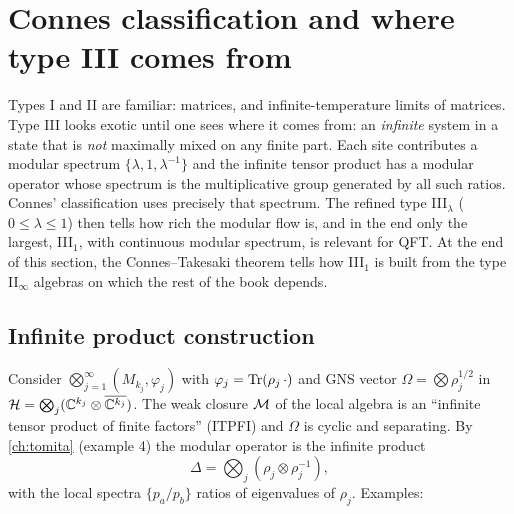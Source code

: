 \section{Connes classification and where type III comes from}\label{ch:connes_class}

\mshift{51mm}\begin{physmotiv}
Types I and II are familiar: matrices, and infinite-temperature limits of matrices. Type III looks exotic until one sees where it comes from: an \emph{infinite} system in a state that is \emph{not} maximally mixed on any finite part. Each site contributes a modular spectrum $\{\lambda,1,\lambda^{-1}\}$ and the infinite tensor product has a modular operator whose spectrum is the multiplicative group generated by all such ratios. Connes' classification uses precisely that spectrum. The refined type III$_\lambda$ ($0\le\lambda\le1$) then tells how rich the modular flow is, and in the end only the largest, III$_1$, with continuous modular spectrum, is relevant for QFT. At the end of this section, the Connes--Takesaki theorem tells how III$_1$ is built from the type II$_\infty$ algebras on which the rest of the book depends.
\end{physmotiv}

\subsection{Infinite product construction}

Consider $\bigotimes_{j=1}^\infty(M_{k_j},\varphi_j)$ with $\varphi_j=\operatorname{Tr}(\rho_j\,\cdot)$ and GNS vector $\Omega=\bigotimes\rho_j^{1/2}$ in $\mathcal{H}=\bigotimes_j(\mathbb{C}^{k_j}\otimes\overline{\mathbb{C}^{k_j}})$. The weak closure $\mathcal{M}$ of the local algebra is an ``infinite tensor product of finite factors'' (ITPFI) and $\Omega$ is cyclic and separating. By \cref{ch:tomita} (example 4) the modular operator is the infinite product
\begin{equation}
\Delta=\bigotimes_j(\rho_j\otimes\rho_j^{-1}),
\end{equation}
with the local spectra $\{p_a/p_b\}$ ratios of eigenvalues of $\rho_j$. Examples:

